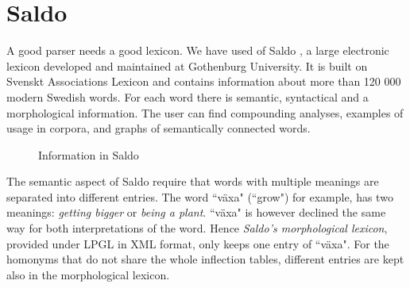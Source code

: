 \documentclass{report}
\begin{document}
\section{Saldo}
\label{sec:saldo}
A good parser needs a good lexicon. We have used of Saldo \cite{saldo}, a
large electronic lexicon developed and maintained at Gothenburg University. It is
built on Svenskt Associations Lexicon and contains information about more than 
120 000 modern Swedish words.
For each word there is semantic, syntactical and a morphological
information. The user can find compounding analyses, examples of usage in corpora,
and graphs of semantically connected words.\\
\begin{figure}[h!]
\centering
{}
\hspace{20mm}
\caption{Information in Saldo}
\label{fig:saldo}
\end{figure}

The semantic aspect of Saldo require that words with multiple meanings are
separated into different entries.
The word ``växa" (``grow") for example, has two meanings: \emph{getting
bigger}
or \emph{being a plant}. 
``växa" is however declined the same way for both interpretations of the word.
Hence \textit{Saldo's morphological lexicon}, provided under LPGL in XML format,
only keeps one entry of ``växa".
For the homonyms that do not share the whole inflection tables, different entries are 
kept also in the morphological lexicon.
\end{document}
